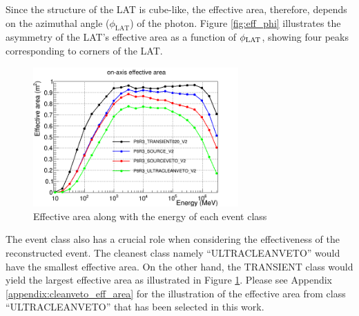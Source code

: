 Since the structure of the LAT is cube-like, the effective area,
therefore, depends on the azimuthal angle
($\phi_\text{LAT}$) of the photon. Figure \ref{fig:eff_phi} illustrates
the asymmetry of the LAT's effective area as a function of
$\phi_{\rm LAT}$, showing four peaks corresponding to corners
of the LAT.



\begin{figure}[h!]
    \centering
    \includegraphics[width=0.7\textwidth]{content/background/figures/eff_event_class.png}
    \caption{Effective area along with the energy of each event class \citep{lat_p8_performance}}
    \label{fig:eff_event_class}
\end{figure}


The event class also has a crucial role when considering the effectiveness of the reconstructed event.
The cleanest class namely ``ULTRACLEANVETO'' would have the smallest
effective area. On the other hand, the TRANSIENT class would yield 
the largest effective area as illustrated in Figure \ref{fig:eff_event_class}.
Please see Appendix \ref{appendix:cleanveto_eff_area} for the illustration
of the effective area from class ``ULTRACLEANVETO'' that has been selected 
in this work.